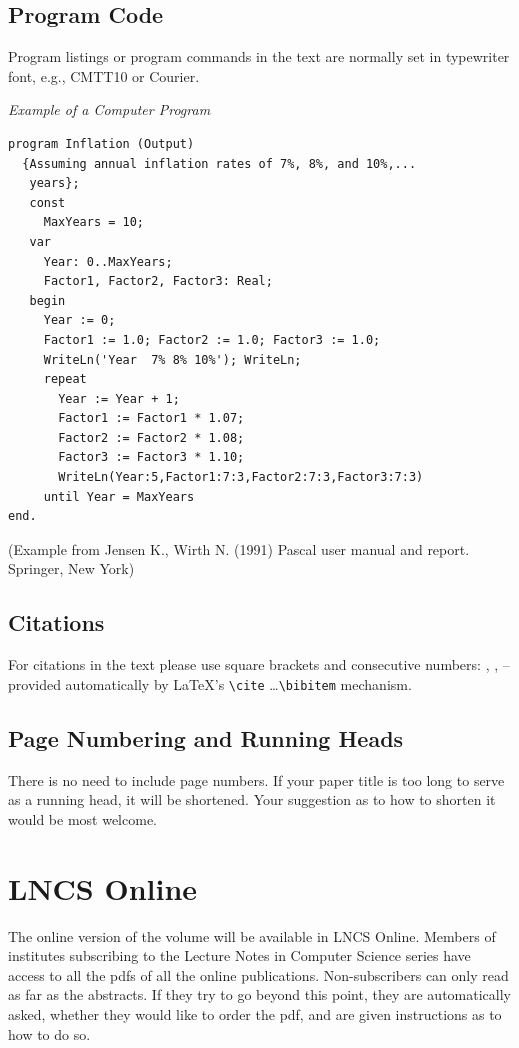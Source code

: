 \documentclass[runningheads,a4paper]{llncs}
\begin{document}
\subsection{Program Code}

Program listings or program commands in the text are normally set in
typewriter font, e.g., CMTT10 or Courier.

\medskip

\noindent
{\it Example of a Computer Program}
\begin{verbatim}
program Inflation (Output)
  {Assuming annual inflation rates of 7%, 8%, and 10%,...
   years};
   const
     MaxYears = 10;
   var
     Year: 0..MaxYears;
     Factor1, Factor2, Factor3: Real;
   begin
     Year := 0;
     Factor1 := 1.0; Factor2 := 1.0; Factor3 := 1.0;
     WriteLn('Year  7% 8% 10%'); WriteLn;
     repeat
       Year := Year + 1;
       Factor1 := Factor1 * 1.07;
       Factor2 := Factor2 * 1.08;
       Factor3 := Factor3 * 1.10;
       WriteLn(Year:5,Factor1:7:3,Factor2:7:3,Factor3:7:3)
     until Year = MaxYears
end.
\end{verbatim}
%
\noindent
{\small (Example from Jensen K., Wirth N. (1991) Pascal user manual and
report. Springer, New York)}

\subsection{Citations}

For citations in the text please use
square brackets and consecutive numbers: \cite{jour}, \cite{lncschap},
\cite{proceeding1} -- provided automatically
by \LaTeX 's \verb|\cite| \dots\verb|\bibitem| mechanism.

\subsection{Page Numbering and Running Heads}

There is no need to include page numbers. If your paper title is too
long to serve as a running head, it will be shortened. Your suggestion
as to how to shorten it would be most welcome.

\section{LNCS Online}

The online version of the volume will be available in LNCS Online.
Members of institutes subscribing to the Lecture Notes in Computer
Science series have access to all the pdfs of all the online
publications. Non-subscribers can only read as far as the abstracts. If
they try to go beyond this point, they are automatically asked, whether
they would like to order the pdf, and are given instructions as to how
to do so.
\end{document}
